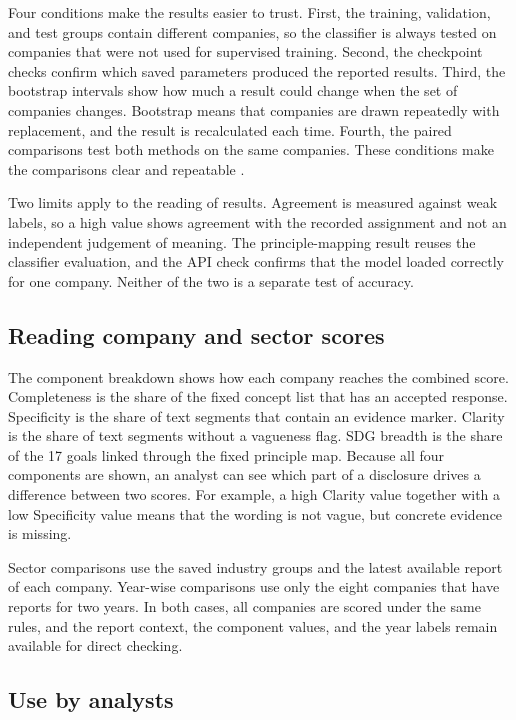 Four conditions make the results easier to trust. First, the training, validation, and test groups contain different companies, so the classifier is always tested on companies that were not used for supervised training. Second, the checkpoint checks confirm which saved parameters produced the reported results. Third, the bootstrap intervals show how much a result could change when the set of companies changes. Bootstrap means that companies are drawn repeatedly with replacement, and the result is recalculated each time. Fourth, the paired comparisons test both methods on the same companies. These conditions make the comparisons clear and repeatable \cite{kapoor2023}.

Two limits apply to the reading of results. Agreement is measured against weak labels, so a high value shows agreement with the recorded assignment and not an independent judgement of meaning. The principle-mapping result reuses the classifier evaluation, and the API check confirms that the model loaded correctly for one company. Neither of the two is a separate test of accuracy.

\subsection{Reading company and sector scores}

The component breakdown shows how each company reaches the combined score. Completeness is the share of the fixed concept list that has an accepted response. Specificity is the share of text segments that contain an evidence marker. Clarity is the share of text segments without a vagueness flag. SDG breadth is the share of the 17 goals linked through the fixed principle map. Because all four components are shown, an analyst can see which part of a disclosure drives a difference between two scores. For example, a high Clarity value together with a low Specificity value means that the wording is not vague, but concrete evidence is missing.

Sector comparisons use the saved industry groups and the latest available report of each company. Year-wise comparisons use only the eight companies that have reports for two years. In both cases, all companies are scored under the same rules, and the report context, the component values, and the year labels remain available for direct checking.

\subsection{Use by analysts}

